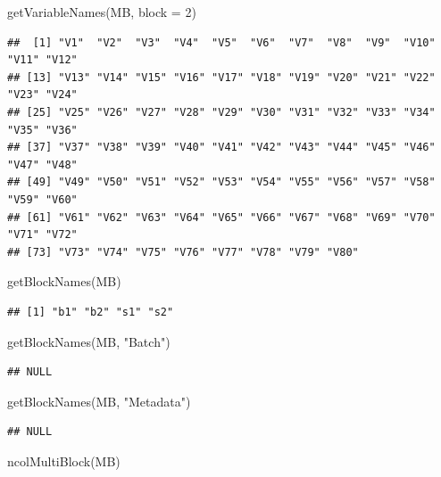 \documentclass[
]{book}
\newenvironment{Shaded}{\begin{snugshade}}{\end{snugshade}}
\newcommand{\AttributeTok}[1]{\textcolor[rgb]{0.77,0.63,0.00}{#1}}
\newcommand{\DecValTok}[1]{\textcolor[rgb]{0.00,0.00,0.81}{#1}}
\newcommand{\FunctionTok}[1]{\textcolor[rgb]{0.00,0.00,0.00}{#1}}
\newcommand{\NormalTok}[1]{#1}
\newcommand{\StringTok}[1]{\textcolor[rgb]{0.31,0.60,0.02}{#1}}
\begin{document}
\begin{Shaded}
\begin{Highlighting}[]
\FunctionTok{getVariableNames}\NormalTok{(MB, }\AttributeTok{block =} \DecValTok{2}\NormalTok{)}
\end{Highlighting}
\end{Shaded}

\begin{verbatim}
##  [1] "V1"  "V2"  "V3"  "V4"  "V5"  "V6"  "V7"  "V8"  "V9"  "V10" "V11" "V12"
## [13] "V13" "V14" "V15" "V16" "V17" "V18" "V19" "V20" "V21" "V22" "V23" "V24"
## [25] "V25" "V26" "V27" "V28" "V29" "V30" "V31" "V32" "V33" "V34" "V35" "V36"
## [37] "V37" "V38" "V39" "V40" "V41" "V42" "V43" "V44" "V45" "V46" "V47" "V48"
## [49] "V49" "V50" "V51" "V52" "V53" "V54" "V55" "V56" "V57" "V58" "V59" "V60"
## [61] "V61" "V62" "V63" "V64" "V65" "V66" "V67" "V68" "V69" "V70" "V71" "V72"
## [73] "V73" "V74" "V75" "V76" "V77" "V78" "V79" "V80"
\end{verbatim}

\begin{Shaded}
\begin{Highlighting}[]
\FunctionTok{getBlockNames}\NormalTok{(MB)}
\end{Highlighting}
\end{Shaded}

\begin{verbatim}
## [1] "b1" "b2" "s1" "s2"
\end{verbatim}

\begin{Shaded}
\begin{Highlighting}[]
\FunctionTok{getBlockNames}\NormalTok{(MB, }\StringTok{"Batch"}\NormalTok{)}
\end{Highlighting}
\end{Shaded}

\begin{verbatim}
## NULL
\end{verbatim}

\begin{Shaded}
\begin{Highlighting}[]
\FunctionTok{getBlockNames}\NormalTok{(MB, }\StringTok{"Metadata"}\NormalTok{)}
\end{Highlighting}
\end{Shaded}

\begin{verbatim}
## NULL
\end{verbatim}

\begin{Shaded}
\begin{Highlighting}[]
\FunctionTok{ncolMultiBlock}\NormalTok{(MB)}
\end{Highlighting}
\end{Shaded}
\end{document}
